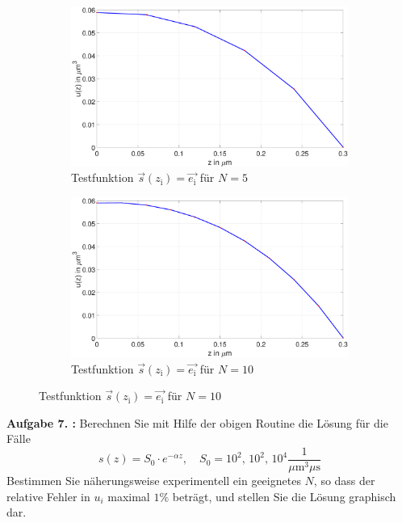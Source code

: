 \begin{figure}[htb]
\newline
\begin{subfigure}[b]{.5\textwidth}
		\centering
	\includegraphics[width=1\linewidth]{figures/station_gl_2_1/aufgabe_7_test_n5}
	\caption{Testfunktion $\vec{s}(z_\mathrm{i})=\vec{e_\mathrm{i}}$ für $N=5$}
\end{subfigure}
\begin{subfigure}[b]{.5\textwidth}
	\centering
	\includegraphics[width=1\linewidth]{figures/station_gl_2_1/aufgabe_7_test_n10}
	\caption{Testfunktion $\vec{s}(z_\mathrm{i})=\vec{e_\mathrm{i}}$ für $N=10$}
\end{subfigure}
\end{figure}
\begin{mybox}
\textbf{Aufgabe 7. :}	Berechnen Sie mit Hilfe der obigen Routine die Lösung für die Fälle 
\begin{equation}
	s(z)=S_0\cdot e^{-\alpha z}, \quad S_0=10^2, \, 10^2, \, 10^4 \frac{1}{\si{\mu\meter^3 \mu \s}}
\end{equation}
Bestimmen Sie näherungsweise experimentell ein geeignetes $N$, so dass der relative Fehler in $u_i$
maximal $1\%$ beträgt, und stellen Sie die Lösung graphisch dar.
\end{mybox}

